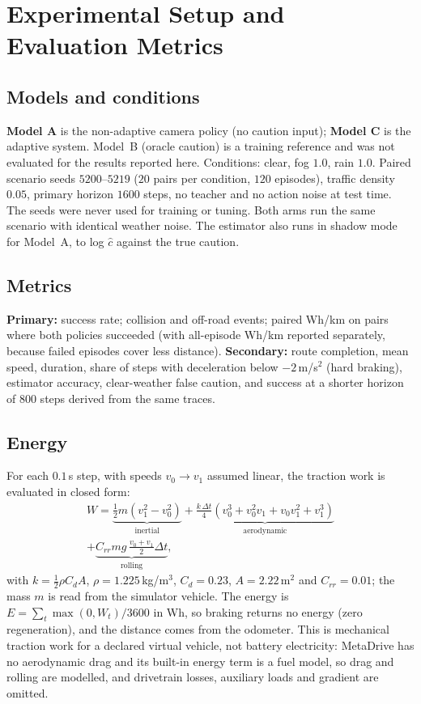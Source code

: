 \documentclass[conference]{IEEEtran}
\newcommand{\chat}{\hat{c}}
\begin{document}
\section{Experimental Setup and Evaluation Metrics}
\subsection{Models and conditions}
\textbf{Model A} is the non-adaptive camera policy (no caution input); \textbf{Model C} is the adaptive system. Model~B (oracle caution) is a training reference and was not evaluated for the results reported here. Conditions: clear, fog $1.0$, rain $1.0$. Paired scenario seeds $5200$--$5219$ ($20$ pairs per condition, $120$ episodes), traffic density $0.05$, primary horizon $1600$ steps, no teacher and no action noise at test time. The seeds were never used for training or tuning. Both arms run the same scenario with identical weather noise. The estimator also runs in shadow mode for Model~A, to log $\chat$ against the true caution.

\subsection{Metrics}
\textbf{Primary:} success rate; collision and off-road events; paired Wh/km on pairs where both policies succeeded (with all-episode Wh/km reported separately, because failed episodes cover less distance). \textbf{Secondary:} route completion, mean speed, duration, share of steps with deceleration below $-2$\,m/s$^2$ (hard braking), estimator accuracy, clear-weather false caution, and success at a shorter horizon of $800$ steps derived from the same traces.

\subsection{Energy}
\label{sec:energy}
For each $0.1$\,s step, with speeds $v_0\to v_1$ assumed linear, the traction work is evaluated in closed form:
\begin{multline}
W=\underbrace{\tfrac12 m(v_1^2-v_0^2)}_{\text{inertial}}+\underbrace{\tfrac{k\,\Delta t}{4}(v_0^3+v_0^2v_1+v_0v_1^2+v_1^3)}_{\text{aerodynamic}}\\
+\underbrace{C_{rr}mg\,\tfrac{v_0+v_1}{2}\Delta t}_{\text{rolling}},
\end{multline}
with $k=\tfrac12\rho C_dA$, $\rho=1.225$\,kg/m$^3$, $C_d=0.23$, $A=2.22$\,m$^2$ and $C_{rr}=0.01$; the mass $m$ is read from the simulator vehicle. The energy is $E=\sum_t\max(0,W_t)/3600$ in Wh, so braking returns no energy (zero regeneration), and the distance comes from the odometer. This is mechanical traction work for a declared virtual vehicle, not battery electricity: MetaDrive has no aerodynamic drag and its built-in energy term is a fuel model, so drag and rolling are modelled, and drivetrain losses, auxiliary loads and gradient are omitted.
\end{document}

